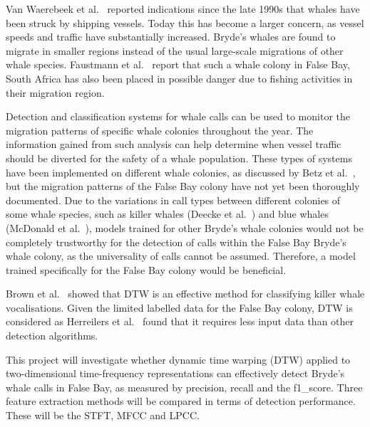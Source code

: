 \label{chap:introduction}

\label{sec:background-overview}
Van Waerebeek et al.~\cite{vessel_collision_since_1990s} reported indications since the late 1990s 
that whales have been struck by shipping vessels. 
Today this has become a larger concern, as vessel speeds and traffic have substantially increased. 
Bryde's whales are found to migrate in smaller regions 
instead of the usual large-scale migrations of other whale species. Faustmann et al.~\cite{bryde_whales_SA} 
report that such a whale colony in False Bay, 
South Africa has also been placed in possible danger due to fishing activities in their migration region.

Detection and classification systems for whale calls can be used to monitor the migration patterns of 
specific whale colonies throughout 
the year. The information gained from such analysis can help determine when vessel traffic should be 
diverted for the safety of a 
whale population.
These types of systems have been implemented on different whale colonies, as discussed by Betz et 
al.~\cite{reducing_vessel_collisions}, but the migration patterns of the False Bay colony have not 
yet been thoroughly documented. 
Due to the variations in call types between different colonies of some whale species, such as killer 
whales (Deecke et al.~\cite{killer_whale_dialects}) and blue 
whales (McDonald et al.~\cite{blue_whale_song_variation}), models trained for other Bryde's whale 
colonies would not be completely trustworthy for the detection of 
calls within the False Bay Bryde's whale colony, as the universality of calls cannot be assumed. 
Therefore, a model trained specifically for the False 
Bay colony would be beneficial. 

Brown et al.~\cite{DTW_has_worked} showed that \ac{DTW} is an effective method for classifying 
killer whale vocalisations. Given the 
limited labelled data for the False Bay colony, \acs{DTW} is considered as Herreilers et 
al.~\cite{dtw_few_temps} found that it requires less input data than other detection algorithms.

\label{sec:problemstatement}

This project will investigate whether dynamic time warping (\acs{DTW}) applied to two-dimensional time-frequency representations 
can effectively detect Bryde's whale calls in False Bay, as measured by \gls{precision}, \gls{recall} and the \gls{f1_score}.
Three feature extraction methods will be compared in terms of detection performance. These will be the \ac{STFT}, 
\ac{MFCC} and \ac{LPCC}.

